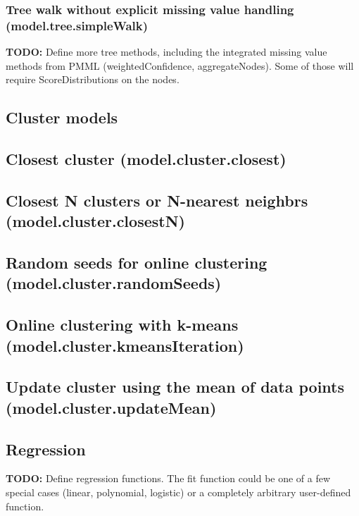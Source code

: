 \documentclass{article}
\theoremstyle{definition}
\begin{document}
\subsubsection{Tree walk without explicit missing value handling (model.tree.simpleWalk)}

{\bf TODO:} Define more tree methods, including the integrated missing value methods from PMML (weightedConfidence, aggregateNodes).  Some of those will require ScoreDistributions on the nodes.

\subsection{Cluster models}

\subsection{Closest cluster (model.cluster.closest)}

\subsection{Closest N clusters or N-nearest neighbrs (model.cluster.closestN)}

\subsection{Random seeds for online clustering (model.cluster.randomSeeds)}

\subsection{Online clustering with k-means (model.cluster.kmeansIteration)}

\subsection{Update cluster using the mean of data points (model.cluster.updateMean)}

\subsection{Regression}

{\bf TODO:} Define regression functions.  The fit function could be one of a few special cases (linear, polynomial, logistic) or a completely arbitrary user-defined function.
\end{document}

